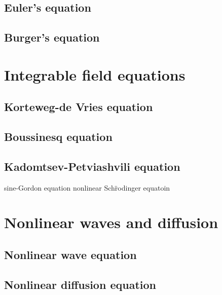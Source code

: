 \documentclass{../../large}
\begin{document}
\section{Euler's equation}
\section{Burger's equation}

\chapter{Integrable field equations}
\section{Korteweg-de Vries equation}
\section{Boussinesq equation}
\section{Kadomtsev-Petviashvili equation}

sine-Gordon equation
nonlinear Sch\"rodinger equatoin

\chapter{Nonlinear waves and diffusion}
\section{Nonlinear wave equation}
\section{Nonlinear diffusion equation}
\end{document}
